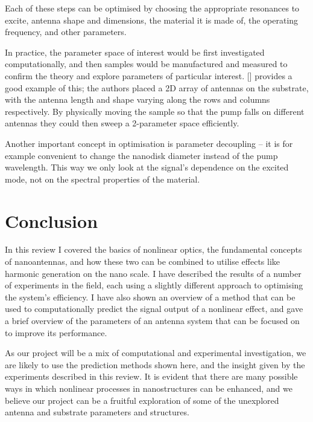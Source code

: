 \documentclass[12pt,a4paper]{article}
\newcommand{\citein}[1]{[\citen{#1}]}
\begin{document}
Each of these steps can be optimised by choosing the appropriate resonances to excite, antenna shape and dimensions, the material it is made of, the operating frequency, and other parameters.

In practice, the parameter space of interest would be first investigated computationally, and then samples would be manufactured and measured to confirm the theory and explore parameters of particular interest. \citein{obrienPredictingNonlinearProperties2015} provides a good example of this; the authors placed a 2D array of antennas on the substrate, with the antenna length and shape varying along the rows and columns respectively. By physically moving the sample so that the pump falls on different antennas they could then sweep a 2-parameter space efficiently.

Another important concept in optimisation is parameter decoupling -- it is for example convenient
to change the nanodisk diameter instead of the pump wavelength\cite{obrienPredictingNonlinearProperties2015, grinblatEnhancedThirdHarmonic2016}. This way we only look at the signal's dependence on the excited mode, not on the spectral properties of the material.

\section{Conclusion}
In this review I covered the basics of nonlinear optics, the fundamental concepts of nanoantennas, and how these two can be combined to utilise effects like harmonic generation on the nano scale. I have described the results of a number of experiments in the field, each using a slightly different approach to optimising the system's efficiency. I have also shown an overview of a method that can be used to computationally predict the signal output of a nonlinear effect, and gave a brief overview of the parameters of an antenna system that can be focused on to improve its performance.

As our project will be a mix of computational and experimental investigation, we are likely to use the prediction methods shown here, and the insight given by the experiments described in this review. It is evident that there are many possible ways in which nonlinear processes in nanostructures can be enhanced, and we believe our project can be a fruitful exploration of some of the unexplored antenna and substrate parameters and structures.



\end{document}
